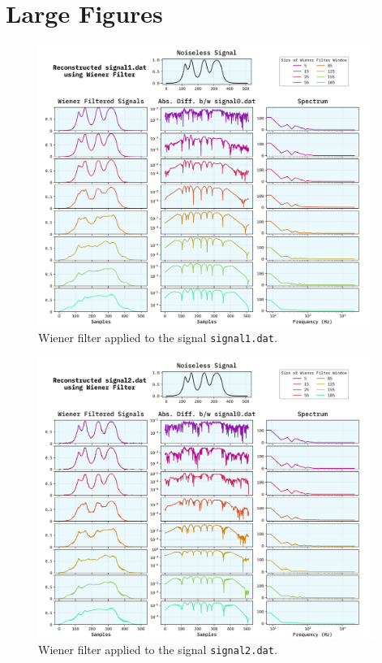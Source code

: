 \documentclass[10pt, titlepage, a4paper]{article}
\begin{document}
\newpage



\newpage
\section{Large Figures}

\begin{figure}[H]
    \centering
    \includegraphics[width=0.98\textwidth]{../WienerFilter/Images/reconstructed-signal1.dat.png}
    \caption{Wiener filter applied to the signal \texttt{signal1.dat}.}
    \label{fig:wiener-filter-1}
\end{figure}

\begin{figure}[H]
    \centering
    \includegraphics[width=0.98\textwidth]{../WienerFilter/Images/reconstructed-signal2.dat.png}
    \caption{Wiener filter applied to the signal \texttt{signal2.dat}.}
    \label{fig:wiener-filter-2}
\end{figure}
\end{document}
